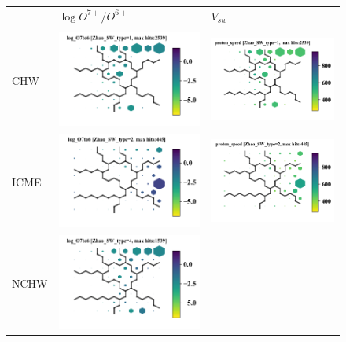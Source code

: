 \documentclass[border=0pt,varwidth=14cm,convert={outext=.jpg,density=300}]{standalone}%
\begin{document}
\pagecolor{white}%
\begin{figure}[h!]\centering
	\begin{tabular}{m{1cm}CC}
		& $\log O^{7+}/O^{6+}$ & $V_{sw}$ \\ \\
		CHW & \includegraphics[width=6cm]{Amaya/SWtype-Zhao_SW_type-1-log_O7to6} &
		\includegraphics[width=6cm]{Amaya/SWtype-Zhao_SW_type-1-proton_speed}\hfill	\\
		ICME & \includegraphics[width=6cm]{Amaya/SWtype-Zhao_SW_type-2-log_O7to6} &
		\includegraphics[width=6cm]{Amaya/SWtype-Zhao_SW_type-2-proton_speed}\hfill	\\
		NCHW & \includegraphics[width=6cm]{Amaya/SWtype-Zhao_SW_type-4-log_O7to6} &

\end{tabular}
\end{figure}
\end{document}
